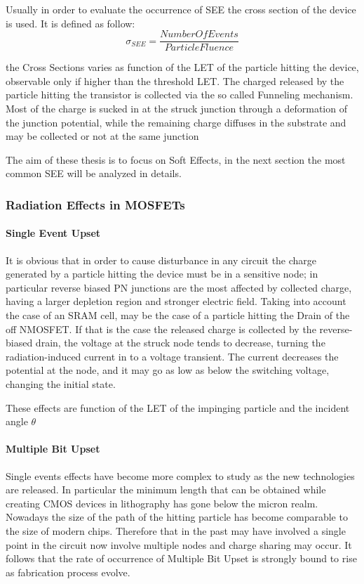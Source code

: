 \documentclass[./dissertation.tex]{subfiles}
\begin{document}
Usually in order to evaluate the occurrence of SEE the cross section of the device is used. It is defined as follow:
\begin{equation}
    \sigma_{SEE} = \frac{NumberOfEvents}{ParticleFluence}
\end{equation}

the Cross Sections varies as function of the LET of the particle hitting the device, observable only if higher than the threshold LET. The charged released by the particle hitting the transistor is collected via the so called Funneling mechanism. Most of the charge is sucked in at the struck junction through a deformation of the junction potential, while the remaining charge diffuses in the substrate and may be collected or not at the same junction\cite{bib1}

The aim of these thesis is to focus on Soft Effects, in the next section the most common SEE will be analyzed in details.

\subsubsection{Radiation Effects in MOSFETs}
\paragraph{Single Event Upset}
It is obvious that in order to cause disturbance in any circuit the charge generated by a particle hitting the device must be in a sensitive node; in particular reverse biased PN junctions are the most affected by collected charge, having a larger depletion region and stronger electric field. Taking into account the case of an SRAM cell, may be the case of a particle hitting the Drain of the off NMOSFET. If that is the case the released charge is collected by the reverse-biased drain, the voltage at the struck node tends to decrease, turning the radiation-induced current in to a voltage transient. The current decreases the potential at the node, and it may go as low as below the switching voltage, changing the initial state.

These effects are function of the LET of the impinging particle and the incident angle $\theta$

\paragraph{Multiple Bit Upset}
Single events effects have become more complex  to study as the new technologies are released. In particular the minimum length that can be obtained while creating CMOS devices in lithography has gone below the micron realm. Nowadays the size of the path of the hitting particle has become comparable to the size of modern chips. Therefore that in the past may have involved a single point in the circuit now involve multiple nodes and charge sharing may occur. It follows that the rate of occurrence of Multiple Bit Upset is strongly bound to rise as fabrication process evolve.
\end{document}
